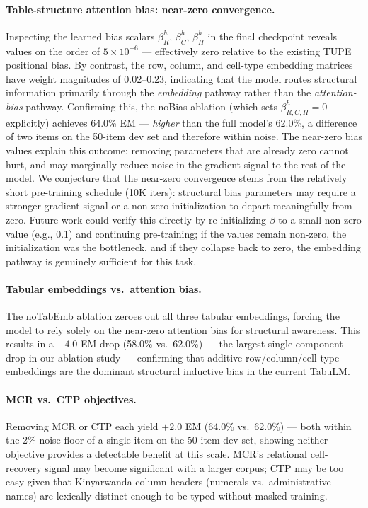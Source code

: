 \documentclass[11pt]{article}
\begin{document}
\paragraph{Table-structure attention bias: near-zero convergence.}
Inspecting the learned bias scalars $\beta^h_R$, $\beta^h_C$, $\beta^h_H$ in the final checkpoint reveals values on the order of $5\times10^{-6}$ --- effectively zero relative to the existing TUPE positional bias.
By contrast, the row, column, and cell-type embedding matrices have weight magnitudes of 0.02--0.23, indicating that the model routes structural information primarily through the \emph{embedding} pathway rather than the \emph{attention-bias} pathway.
Confirming this, the noBias ablation (which sets $\beta^h_{R,C,H}=0$ explicitly) achieves 64.0\% EM --- \emph{higher} than the full model's 62.0\%, a difference of two items on the 50-item dev set and therefore within noise.
The near-zero bias values explain this outcome: removing parameters that are already zero cannot hurt, and may marginally reduce noise in the gradient signal to the rest of the model.
We conjecture that the near-zero convergence stems from the relatively short pre-training schedule (10K iters): structural bias parameters may require a stronger gradient signal or a non-zero initialization to depart meaningfully from zero.
Future work could verify this directly by re-initializing $\beta$ to a small non-zero value (e.g., 0.1) and continuing pre-training; if the values remain non-zero, the initialization was the bottleneck, and if they collapse back to zero, the embedding pathway is genuinely sufficient for this task.

\paragraph{Tabular embeddings vs.\ attention bias.}
The noTabEmb ablation zeroes out all three tabular embeddings, forcing the model to rely solely on the near-zero attention bias for structural awareness.
This results in a $-4.0$ EM drop (58.0\% vs.\ 62.0\%) — the largest single-component drop in our ablation study — confirming that additive row/column/cell-type embeddings are the dominant structural inductive bias in the current TabuLM.

\paragraph{MCR vs.\ CTP objectives.}
Removing MCR or CTP each yield $+2.0$ EM (64.0\% vs.\ 62.0\%) --- both within the 2\% noise floor of a single item on the 50-item dev set, showing neither objective provides a detectable benefit at this scale.
MCR's relational cell-recovery signal may become significant with a larger corpus; CTP may be too easy given that Kinyarwanda column headers (numerals vs.\ administrative names) are lexically distinct enough to be typed without masked training.
\end{document}

